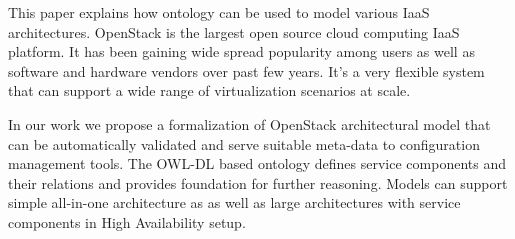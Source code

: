 
This paper explains how ontology can be used to model various IaaS architectures. OpenStack is the largest open source cloud computing IaaS platform. It has been gaining wide spread popularity among users as well as software and hardware vendors over past few years. It's a very flexible system that can support a wide range of virtualization scenarios at scale.

In our work we propose a formalization of OpenStack architectural model that can be automatically validated and serve suitable meta-data to configuration management tools. The OWL-DL based ontology defines service components and their relations and  provides foundation for further reasoning. Models can support simple all-in-one architecture as as well as large architectures with service components in High Availability setup.

